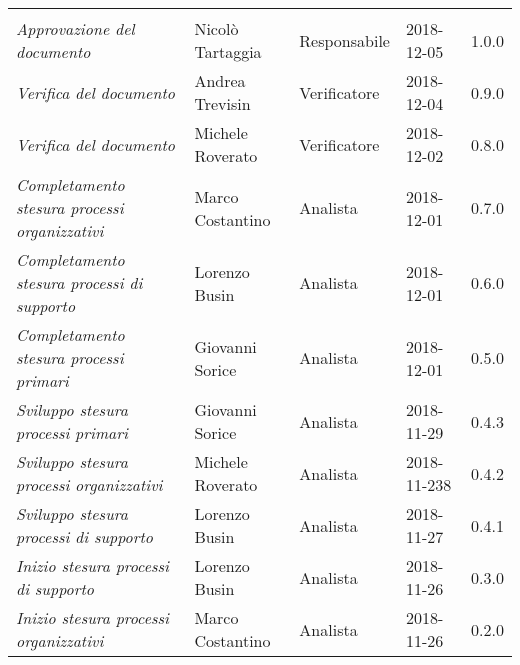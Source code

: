 \newpage 
\section*{}
\begin{table}[H]
	\centering
	\begin{tabular}{p{4cm}|C{3cm}|C{3cm}|R{2.5cm}|R{2cm}}
		
		 & & & & \\
		
		
		\emph{Approvazione del documento} & Nicolò Tartaggia & Responsabile & 2018-12-05 & 1.0.0 \\
		\hline
		
		\emph{Verifica del documento} & Andrea Trevisin & Verificatore & 2018-12-04 & 0.9.0 \\
		\hline
		
		\emph{Verifica del documento} & Michele Roverato & Verificatore & 2018-12-02 & 0.8.0 \\
		\hline
		
		\emph{Completamento stesura processi organizzativi} & Marco Costantino & Analista & 2018-12-01 & 0.7.0 \\
		\hline
		
		\emph{Completamento stesura processi di supporto} & Lorenzo Busin & Analista & 2018-12-01 & 0.6.0 \\
		\hline
		
		\emph{Completamento stesura processi primari} & Giovanni Sorice & Analista & 2018-12-01 & 0.5.0 \\
		\hline
		
		\emph{Sviluppo stesura processi primari} & Giovanni Sorice & Analista & 2018-11-29 & 0.4.3 \\
		\hline
		
		\emph{Sviluppo stesura processi organizzativi} & Michele Roverato & Analista & 2018-11-238 & 0.4.2 \\
		\hline
		
		\emph{Sviluppo stesura processi di supporto} & Lorenzo Busin & Analista & 2018-11-27 & 0.4.1 \\
		\hline
		
		\emph{Inizio stesura processi di supporto} & Lorenzo Busin & Analista & 2018-11-26 & 0.3.0 \\
		\hline
		
		\emph{Inizio stesura processi organizzativi} & Marco Costantino & Analista & 2018-11-26 & 0.2.0 \\
		\hline
		

\end{tabular}
\end{table}
